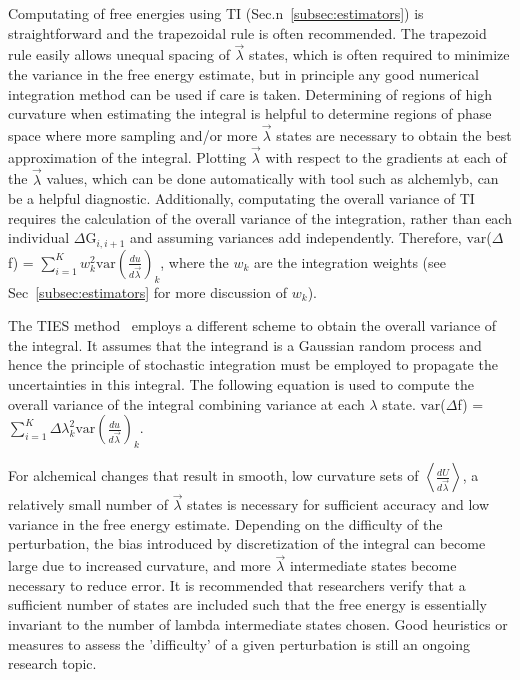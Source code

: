 \documentclass[9pt,bestpractices]{livecoms}
\newcommand{\expect}[1]{\left\langle{#1}\right\rangle}
\begin{document}
Computating of free energies using TI (Sec.n~\ref{subsec:estimators}) is straightforward and the trapezoidal rule is often recommended. The trapezoid rule easily allows unequal spacing of $\vec{\lambda}$ states, which is often required to minimize the variance in the free energy estimate, but in principle any good numerical integration method can be used if care is taken.  
Determining of regions of high curvature when estimating the integral is helpful to determine regions of phase space where more sampling and/or more $\vec{\lambda}$ states are necessary to obtain the best approximation of the integral. Plotting $\vec{\lambda}$ with respect to the gradients at each of the $\vec{\lambda}$ values, which can be done automatically with tool such as alchemlyb,  can be a helpful diagnostic. 
Additionally, computating the overall variance of TI requires the calculation of the overall variance of the integration, rather than each individual $\Delta$G$_{i,i+1}$ and assuming variances add independently. 
Therefore, $\mathrm{var}$($\Delta$f) = $\sum_{i=1}^{K}w_{k}^2 \mathrm{var}(\frac{du}{d\vec{\lambda}})_{k}$, where the $w_k$ are the integration weights (see Sec~\ref{subsec:estimators} for more discussion of $w_k$).

The TIES method~\cite{bhati2017} employs a different scheme to obtain the overall variance of the integral. It assumes that the integrand is a Gaussian random process and hence the principle of stochastic integration must be employed to propagate the uncertainties in this integral. The following equation is used to compute the overall variance of the integral combining variance at each $\lambda$ state. $\mathrm{var}$($\Delta$f) = $\sum_{i=1}^{K}\Delta\lambda_{k}^2 \mathrm{var}(\frac{du}{d\vec{\lambda}})_{k}$. 

For alchemical changes that result in smooth, low curvature sets of $\expect{\frac{dU}{d\vec{\lambda}}}$, a relatively small number of $\vec{\lambda}$ states is necessary for sufficient accuracy and low variance in the free energy estimate. 
Depending on the difficulty of the perturbation, the bias introduced by discretization of the integral can become large due to increased curvature, and more $\vec{\lambda}$ intermediate states become necessary to reduce error.
It is recommended that researchers verify that a sufficient number of states are included such that the free energy is essentially invariant to the number of lambda intermediate states chosen. Good heuristics or measures to assess the 'difficulty' of a given perturbation is still an ongoing research topic. 
\end{document}
